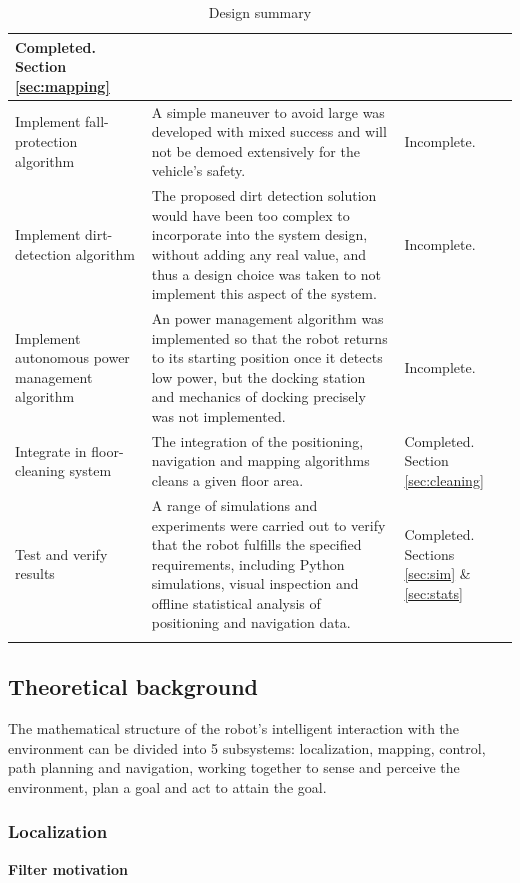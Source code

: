 \begin{longtable}[H]{|p{}|p{}|p{}|}
    Completed. Section \ref{sec:mapping} \\ \hline
    Implement fall-protection algorithm &
    A simple maneuver to avoid large was developed with mixed success and will not be demoed extensively for the vehicle's safety. &
    Incomplete. \\ \hline
    Implement dirt-detection algorithm &
    The proposed dirt detection solution would have been too complex to incorporate into the system design, without adding any real value, and thus a design choice was taken to not implement this aspect of the system. &
    Incomplete. \\ \hline
    Implement autonomous power management algorithm & 
    An power management algorithm was implemented so that the robot returns to its starting position once it detects low power, but the docking station and mechanics of docking precisely was not implemented. &
    Incomplete. \\ \hline
    Integrate in floor-cleaning system &
    The integration of the positioning, navigation and mapping algorithms cleans a given floor area. &
    Completed. Section \ref{sec:cleaning} \\ \hline
    Test and verify results &
    A range of simulations and experiments were carried out to verify that the robot fulfills the specified requirements, including Python simulations, visual inspection and offline statistical analysis of positioning and navigation data. &
    Completed. Sections \ref{sec:sim} \& \ref{sec:stats} \\ \hline
    \caption{Design summary}
    \label{tab:design_sum}
\end{longtable}

\subsection{Theoretical background}
\label{sec:theory}

The mathematical structure of the robot's intelligent interaction with the environment can be divided into 5 subsystems: localization, mapping, control, path planning and navigation, working together to sense and perceive the environment, plan a goal and act to attain the goal.

\subsubsection{Localization}
\label{sec:localize}

\textbf{Filter motivation}

